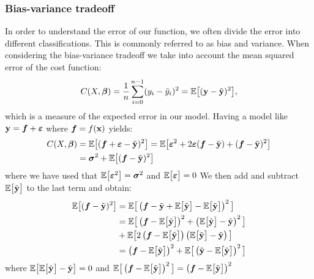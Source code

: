 \subsubsection{Bias-variance tradeoff}\label{sec:bias_variance_tradeoff}
In order to understand the error of our function, we often divide the error into different classifications. This is commonly referred to as bias and variance. When considering the bias-variance tradeoff we take into account the mean squared error of the cost function:
\begin{align*}
    C(X, \boldsymbol{\beta}) = \frac{1}{n}\sum_{i=0}^{n-1}(y_i-\tilde{y}_i)^2 = \mathbb{E}\big[(\mathbf{y}-\tilde{\mathbf{y}})^2\big],
\end{align*}
which is a measure of the expected error in our model. Having a model like $\mathbf{y} = \boldsymbol{f} + \boldsymbol{\varepsilon}$ where $\boldsymbol{f} = f(\mathbf{x})$ yields:
\begin{align*}
    C(X, \boldsymbol{\beta})  &= \mathbb{E}\big[(\boldsymbol{f} + \boldsymbol{\varepsilon} - \tilde{\mathbf{y}})^2\big] = \mathbb{E}\big[\boldsymbol{\varepsilon}^2 + 2\boldsymbol{\varepsilon}(\boldsymbol{f}-\tilde{\mathbf{y}}) + (\boldsymbol{f}-\tilde{\mathbf{y}})^2\big] \\
    &= \boldsymbol{\sigma}^2 + \mathbb{E}\big[(\boldsymbol{f}-\tilde{\mathbf{y}})^2\big]
\end{align*}
where we have used that $\mathbb{E}\big[\boldsymbol{\varepsilon}^2\big] = \boldsymbol{\sigma}^2$ and $\mathbb{E}\big[\boldsymbol{\varepsilon}\big] = 0$ We then add and subtract $\mathbb{E}\big[\tilde{\mathbf{y}}\big]$ to the last term and obtain:
\begin{align*}
    \mathbb{E}\big[(\boldsymbol{f}-\tilde{\mathbf{y}})^2\big] &= \mathbb{E}\big[\left(\boldsymbol{f}-\tilde{\mathbf{y}}+\mathbb{E}\big[\tilde{\mathbf{y}}\big]-\mathbb{E}\big[\tilde{\mathbf{y}}\big]\right)^2\big] \\
    &= \mathbb{E}\big[\left(\boldsymbol{f}-\mathbb{E}\big[\tilde{\mathbf{y}}\big]\right)^2+ \left(\mathbb{E}\big[\tilde{\mathbf{y}}\big]-\tilde{\mathbf{y}}\right)^2\big] \\
    &+ \mathbb{E}\big[2\left(\boldsymbol{f}-\mathbb{E}\big[\tilde{\mathbf{y}}\big]\right)\left(\mathbb{E}\big[\tilde{\mathbf{y}}\big]-\tilde{\mathbf{y}}\right)\big] \\
    &=\left(\boldsymbol{f}-\mathbb{E}\big[\tilde{\mathbf{y}}\big]\right)^2+ \mathbb{E}\big[\left(\tilde{\mathbf{y}}-\mathbb{E}\big[\tilde{\mathbf{y}}\big]\right)^2\big]
\end{align*}
where $\mathbb{E}\big[\mathbb{E}\big[\tilde{\mathbf{y}}\big] - \tilde{\mathbf{y}}\big] = 0$ and $\mathbb{E}\big[\left(\boldsymbol{f}-\mathbb{E}\big[\tilde{\mathbf{y}}\big]\right)^2\big]=\left(\boldsymbol{f}-\mathbb{E}\big[\tilde{\mathbf{y}}\big]\right)^2$

